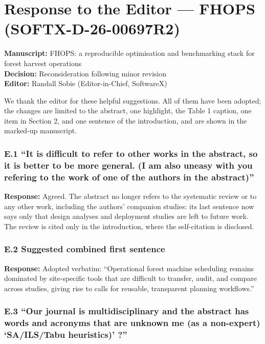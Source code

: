 \section*{Response to the Editor --- FHOPS
(SOFTX-D-26-00697R2)}\label{response-to-the-editor-fhops-softx-d-26-00697r2}

\textbf{Manuscript:} FHOPS: a reproducible optimisation and benchmarking
stack for forest harvest operations\\
\textbf{Decision:} Reconsideration following minor revision\\
\textbf{Editor:} Randall Sobie (Editor-in-Chief, SoftwareX)

We thank the editor for these helpful suggestions. All of them have been
adopted; the changes are limited to the abstract, one highlight, the
Table 1 caption, one item in Section 2, and one sentence of the
introduction, and are shown in the marked-up manuscript.

\subsubsection*{E.1 ``It is difficult to refer to other works in the
abstract, so it is better to be more general. (I am also uneasy with you
refering to the work of one of the authors in the
abstract)''}\label{e.1-it-is-difficult-to-refer-to-other-works-in-the-abstract-so-it-is-better-to-be-more-general.-i-am-also-uneasy-with-you-refering-to-the-work-of-one-of-the-authors-in-the-abstract}

\textbf{Response:} Agreed. The abstract no longer refers to the
systematic review or to any other work, including the authors' companion
studies: its last sentence now says only that design analyses and
deployment studies are left to future work. The review is cited only in
the introduction, where the self-citation is disclosed.

\subsubsection*{E.2 Suggested combined first
sentence}\label{e.2-suggested-combined-first-sentence}

\textbf{Response:} Adopted verbatim: ``Operational forest machine
scheduling remains dominated by site-specific tools that are difficult
to transfer, audit, and compare across studies, giving rise to calls for
reusable, transparent planning workflows.''

\subsubsection*{E.3 ``Our journal is multidisciplinary and the abstract
has words and acronyms that are unknown me (as a non-expert)
`SA/ILS/Tabu heuristics)'
?''}\label{e.3-our-journal-is-multidisciplinary-and-the-abstract-has-words-and-acronyms-that-are-unknown-me-as-a-non-expert-sailstabu-heuristics}

